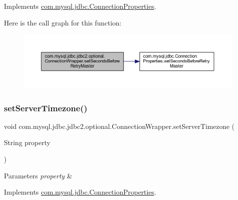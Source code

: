 Implements \mbox{\hyperlink{interfacecom_1_1mysql_1_1jdbc_1_1_connection_properties_aebbbaaab658a9df1fd2af21e9c3ccbf5}{com.\+mysql.\+jdbc.\+Connection\+Properties}}.

Here is the call graph for this function\+:
\nopagebreak
\begin{figure}[H]
\begin{center}
\leavevmode
\includegraphics[width=350pt]{classcom_1_1mysql_1_1jdbc_1_1jdbc2_1_1optional_1_1_connection_wrapper_af7f390ffe3cd2dea5f5192e52147be89_cgraph}
\end{center}
\end{figure}
\mbox{\label{classcom_1_1mysql_1_1jdbc_1_1jdbc2_1_1optional_1_1_connection_wrapper_a7163560fbf41796601a4d01ef978dd09}} 
\subsubsection{\texorpdfstring{set\+Server\+Timezone()}{setServerTimezone()}}
{\footnotesize\ttfamily void com.\+mysql.\+jdbc.\+jdbc2.\+optional.\+Connection\+Wrapper.\+set\+Server\+Timezone (\begin{DoxyParamCaption}\item[{String}]{property }\end{DoxyParamCaption})}


\begin{DoxyParams}{Parameters}
{\em property} & \\
\hline
\end{DoxyParams}


Implements \mbox{\hyperlink{interfacecom_1_1mysql_1_1jdbc_1_1_connection_properties_a696230dd8e57568c8742fffecb1040aa}{com.\+mysql.\+jdbc.\+Connection\+Properties}}.

